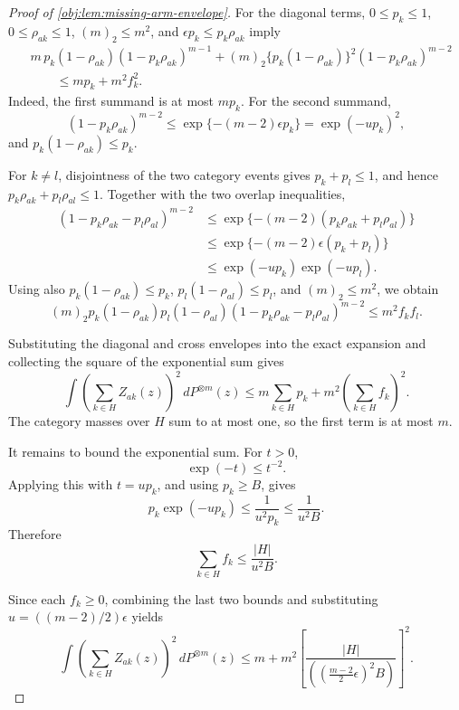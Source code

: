 \documentclass[11pt]{article}
\begin{document}
\begin{proof}[Proof of \cref{obj:lem:missing-arm-envelope}]
For the diagonal terms, \(0\le p_k\le1\), \(0\le\rho_{ak}\le1\), \((m)_2\le m^2\), and
\(\epsilon p_k\le p_k\rho_{ak}\) imply
\[
\begin{aligned}
&m\,p_k(1-\rho_{ak})(1-p_k\rho_{ak})^{m-1}
+
(m)_2\{p_k(1-\rho_{ak})\}^2(1-p_k\rho_{ak})^{m-2}
\\
&\qquad\le
m p_k+m^2 f_k^2 .
\end{aligned}
\]
Indeed, the first summand is at most \(m p_k\). For the second summand,
\[
(1-p_k\rho_{ak})^{m-2}
\le
\exp\{-(m-2)\epsilon p_k\}
=
\exp(-up_k)^2,
\]
and \(p_k(1-\rho_{ak})\le p_k\). %

For \(k\ne l\), disjointness of the two category events gives \(p_k+p_l\le1\), and hence
\(p_k\rho_{ak}+p_l\rho_{al}\le1\). Together with the two overlap inequalities,
\[
\begin{aligned}
(1-p_k\rho_{ak}-p_l\rho_{al})^{m-2}
&\le
\exp\{-(m-2)(p_k\rho_{ak}+p_l\rho_{al})\}
\\
&\le
\exp\{-(m-2)\epsilon(p_k+p_l)\}
\\
&\le
\exp(-up_k)\exp(-up_l).
\end{aligned}
\]
Using also \(p_k(1-\rho_{ak})\le p_k\), \(p_l(1-\rho_{al})\le p_l\), and \((m)_2\le m^2\), we obtain
\[
(m)_2 p_k(1-\rho_{ak})p_l(1-\rho_{al})
(1-p_k\rho_{ak}-p_l\rho_{al})^{m-2}
\le
m^2 f_kf_l .
\]

Substituting the diagonal and cross envelopes into the exact expansion and collecting the square of the
exponential sum gives
\[
\int \left(\sum_{k\in H}Z_{ak}(z)\right)^2\,dP^{\otimes m}(z)
\le
m\sum_{k\in H}p_k
+
m^2\left(\sum_{k\in H}f_k\right)^2 .
\]
The category masses over \(H\) sum to at most one, so the first term is at most \(m\). %

It remains to bound the exponential sum. For \(t>0\),
\[
\exp(-t)\le t^{-2}.
\]
Applying this with \(t=up_k\), and using \(p_k\ge B\), gives
\[
p_k\exp(-up_k)
\le
\frac{1}{u^2p_k}
\le
\frac{1}{u^2B}.
\]
Therefore
\[
\sum_{k\in H}f_k
\le
\frac{|H|}{u^2B}.
\]

Since each \(f_k\ge0\), combining the last two bounds and substituting
\(u=((m-2)/2)\epsilon\) yields
\[
\int \left(\sum_{k\in H}Z_{ak}(z)\right)^2\,dP^{\otimes m}(z)
\le
m+m^2
\left[
\frac{|H|}
{\left(\left(\frac{m-2}{2}\epsilon\right)^2B\right)}
\right]^2 .
\]
\end{proof}
\end{document}
